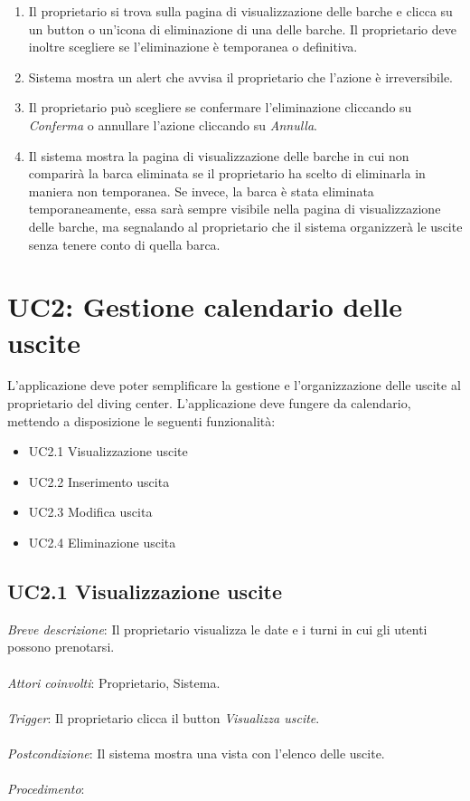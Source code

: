 \begin{enumerate}
    \item Il proprietario si trova sulla pagina di visualizzazione delle barche e clicca su un button o un'icona di eliminazione di una delle barche. Il proprietario deve inoltre
          scegliere se l'eliminazione è temporanea o definitiva.
    \item Sistema mostra un alert che avvisa il proprietario che l'azione è irreversibile.
    \item Il proprietario può scegliere se confermare l'eliminazione cliccando su \textit{Conferma} o annullare l'azione cliccando su \textit{Annulla}.
    \item Il sistema mostra la pagina di visualizzazione delle barche in cui non comparirà la barca eliminata se il proprietario ha scelto di eliminarla in maniera non temporanea.
          Se invece, la barca è stata eliminata temporaneamente, essa sarà sempre visibile nella pagina di visualizzazione delle barche, ma segnalando al proprietario che il sistema organizzerà
          le uscite senza tenere conto di quella barca.
\end{enumerate}

\section{UC2: Gestione calendario delle uscite}
L'applicazione deve poter semplificare la gestione e l'organizzazione delle uscite al proprietario del diving center.
L'applicazione deve fungere da calendario, mettendo a disposizione le seguenti funzionalità:

\begin{itemize}
    \item UC2.1 Visualizzazione uscite
    \item UC2.2 Inserimento uscita
    \item UC2.3 Modifica uscita
    \item UC2.4 Eliminazione uscita
\end{itemize}

\subsection{UC2.1 Visualizzazione uscite}

\emph{Breve descrizione}: Il proprietario visualizza le date e i turni in cui gli utenti possono prenotarsi.\\\\
\emph{Attori coinvolti}: Proprietario, Sistema.\\\\
\emph{Trigger}: Il proprietario clicca il button \textit{Visualizza uscite}.\\\\
\emph{Postcondizione}: Il sistema mostra una vista con l'elenco delle uscite.\\\\
\emph{Procedimento}:

